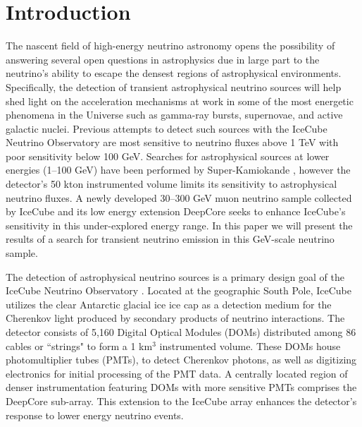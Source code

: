 \documentclass[manuscript]{aastex}
\begin{document}



\section{Introduction}
The nascent field of high-energy neutrino astronomy opens the possibility of answering several open questions in astrophysics due in large part to the neutrino's ability to escape the densest regions of astrophysical environments. Specifically, the detection of transient astrophysical neutrino sources will help shed light on the acceleration mechanisms at work in some of the most energetic phenomena in the Universe such as gamma-ray bursts, supernovae, and active galactic nuclei. Previous attempts to detect such sources with the IceCube Neutrino Observatory \citep{2006APh....26..155I} are most sensitive to neutrino fluxes above 1 TeV with poor sensitivity below 100 GeV. Searches for astrophysical sources at lower energies (1--100 GeV) have been performed by Super-Kamiokande \citep{2009ApJ...704..503T}, however the detector's 50 kton instrumented volume limits its sensitivity to astrophysical neutrino fluxes. A newly developed 30--300 GeV muon neutrino sample collected by IceCube and its low energy extension DeepCore \citep{2012APh....35..615A} seeks to enhance IceCube's sensitivity in this under-explored energy range. In this paper we will present the results of a search for transient neutrino emission in this GeV-scale neutrino sample.

The detection of astrophysical neutrino sources is a primary design goal of the IceCube Neutrino Observatory \citep{2006APh....26..155I}. Located at the geographic South Pole, IceCube utilizes the clear Antarctic glacial ice ice cap as a detection medium for the Cherenkov light produced by secondary products of neutrino interactions. The detector consists of 5,160 Digital Optical Modules (DOMs) distributed among 86 cables or ``strings" to form a 1 km$^3$ instrumented volume. These DOMs house photomultiplier tubes (PMTs), to detect Cherenkov photons, as well as digitizing electronics for initial processing of the PMT data. A centrally located region of denser instrumentation featuring DOMs with more sensitive PMTs comprises the DeepCore sub-array. This extension to the IceCube array enhances the detector's response to lower energy neutrino events.
\end{document}
